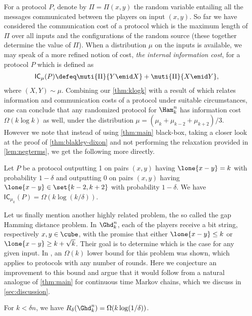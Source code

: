 For a protocol $P$, denote by $\Pi=\Pi(x,y)$ the random variable 
entailing all the messages communicated between the players 
on input $(x,y)$.
So far we have considered the communication cost of a protocol
which is the maximum length of $\Pi$ over all inputs and the 
configurations of the random source (these together determine 
the value of $\Pi$). When a distribution $\mu$
on the inputs is available, we may speak of
a more refined notion of cost, {\em the internal information cost}, 
for a protocol $P$ which is defined as
\begin{align*}
\mathsf{IC}_\mu(P)\defeq \muti{\Pi}{Y\emid X} + \muti{\Pi}{X\emid Y},
\end{align*}
where $(X,Y)\sim\mu$. Combining our 
\autoref{thm:klogk} with a result of \cite{KerenidisLLRX2015}
which relates information and communication costs of a protocol 
under suitable circumstances, one
can conclude that any randomized protocol for $\Ham^n_k$ has
information cost $\Omega(k\log k)$ as well, under the distribution
$\mu = (\mu_k+\mu_{k-2}+\mu_{k+2})/3$. However we note that instead 
of using \autoref{thm:main} black-box,
taking a closer look at the proof of \autoref{thm:blakley-dixon} 
and not performing the relaxation provided in \autoref{lem:negterms},
we get the following more directly.
\begin{theorem}
\label{thm:infocost}
Let $P$ be a protocol outputting 1 on pairs $(x,y)$ having
$\lone{x-y}=k$ with 
probability $1-\delta$ and outputting 0 on pairs 
$(x,y)$ having
$\lone{x-y}\in\set{k-2,k+2}$ with probability $1-\delta$. 
We have 
$\mathsf{IC}_{\mu_k}(P)=\Omega(k\log (k/\delta))$.
\end{theorem}

Let us finally mention another highly related problem, 
the so called the gap Hamming distance problem. 
In $\Ghd^n_{k}$, each of the players receive a bit string,
respectively $x,y\in\cube$, with the promise that either 
$\lone{x-y}\le k$ or $\lone{x-y}\ge k + \sqrt{k}$.
Their goal is to determine which is the case for any given input.
In \cite{ChakrabartiR2012}, an $\Omega(k)$ lower bound
for this problem was shown, which applies to protocols with any
number of rounds.
Here we conjecture an improvement to this bound
and argue that it would follow from a natural analogue of
\autoref{thm:main} for continuous time Markov chains, which
we discuss in \autoref{sec:discussion}.
\begin{conjecture}
\label{conj:ghd}
For $k<\delta n$, we have $R_\delta(\Ghd^n_k) 
= \Omega(k \log(1/\delta))$.
\end{conjecture}

